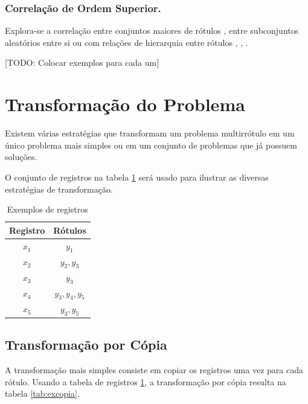 \documentclass[runningheads,a4paper]{llncs}
\begin{document}
\subsubsection{Correlação de Ordem Superior.}

Explora-se a correlação entre conjuntos maiores de rótulos \cite{Read2008-bt}, entre subconjuntos aleatórios entre si \cite{Tsoumakas2007-cw} ou com relações de hierarquia entre rótulos \cite{Vens2008-yp}, \cite{Cesa-Bianchi2006-fk}, \cite{Esuli2008-on}.

[TODO: Colocar exemplos para cada um]


\section{Transformação do Problema}\label{sec:transprob}

Existem várias estratégias que transformam um problema multirrótulo em um único problema mais simples ou em um conjunto de problemas que já possuem soluções.

O conjunto de registros na tabela \ref{tab:exbase} será usado para ilustrar as diversas estratégias de transformação.

\begin{table}
\centering
\begin{tabular}{| c | c |}
	\hline
	\textbf{Registro} & \textbf{Rótulos} \\
	\hline
	$x_1$ & $y_1$ \\
	\hline
	$x_2$ & $y_2, y_3$ \\
	\hline
	$x_3$ & $y_3$ \\
	\hline
	$x_4$ & $y_3, y_4, y_5$ \\
	\hline
	$x_5$ & $y_3, y_5$ \\
	\hline
\end{tabular}
\caption{Exemplos de registros}
\label{tab:exbase}
\end{table}

\subsection{Transformação por Cópia}

A transformação mais simples consiste em copiar os registros uma vez para cada rótulo. Usando a tabela de registros \ref{tab:exbase}, a transformação por cópia resulta na tabela \ref{tab:excopia}.
\end{document}
